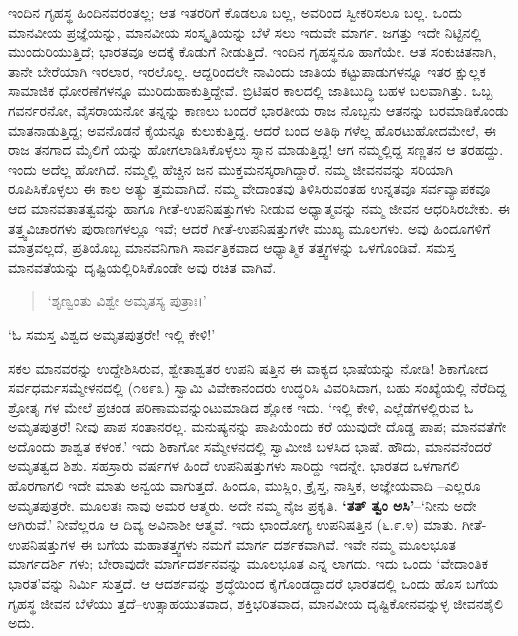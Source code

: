 ಇಂದಿನ ಗೃಹಸ್ಥ ಹಿಂದಿನವರಂತಲ್ಲ; ಆತ ಇತರರಿಗೆ ಕೊಡಲೂ ಬಲ್ಲ, ಅವರಿಂದ ಸ್ವೀಕರಿಸಲೂ ಬಲ್ಲ. ಒಂದು ಮಾನವೀಯ ಪ್ರಜ್ಞೆಯನ್ನು, ಮಾನವೀಯ ಸಂಸ್ಕೃತಿಯನ್ನು ಬೆಳೆ ಸಲು ಇದುವೇ ಮಾರ್ಗ. ಜಗತ್ತು ಇದೇ ನಿಟ್ಟಿನಲ್ಲಿ ಮುಂದುರಿಯುತ್ತಿದೆ; ಭಾರತವೂ ಅದಕ್ಕೆ ಕೊಡುಗೆ ನೀಡುತ್ತಿದೆ. ಇಂದಿನ ಗೃಹಸ್ಥನೂ ಹಾಗೆಯೇ. ಆತ ಸಂಕುಚಿತನಾಗಿ, ತಾನೇ ಬೇರೆಯಾಗಿ ಇರಲಾರ, ಇರಲೊಲ್ಲ. ಆದ್ದರಿಂದಲೇ ನಾವಿಂದು ಜಾತಿಯ ಕಟ್ಟುಪಾಡುಗಳನ್ನೂ ಇತರ ಕ್ಷುಲ್ಲಕ ಸಾಮಾಜಿಕ ಧೋರಣೆಗಳನ್ನೂ ಮುರಿದುಹಾಕುತ್ತಿದ್ದೇವೆ. ಬ್ರಿಟಿಷರ ಕಾಲದಲ್ಲಿ ಜಾತಿಬುದ್ಧಿ ಬಹಳ ಬಲವಾಗಿತ್ತು. ಒಬ್ಬ ಗವರ್ನರನೋ, ವೈಸರಾಯನೋ ತನ್ನನ್ನು ಕಾಣಲು ಬಂದರೆ ಭಾರತೀಯ ರಾಜ ನೊಬ್ಬನು ಆತನನ್ನು ಬರಮಾಡಿಕೊಂಡು ಮಾತನಾಡುತ್ತಿದ್ದ; ಅವನೊಡನೆ ಕೈಯನ್ನೂ ಕುಲುಕುತ್ತಿದ್ದ. ಆದರೆ ಬಂದ ಅತಿಥಿ ಗಳೆಲ್ಲ ಹೊರಟುಹೋದಮೇಲೆ, ಈ ರಾಜ ತನಗಾದ ಮೈಲಿಗೆ ಯನ್ನು ಹೋಗಲಾಡಿಸಿಕೊಳ್ಳಲು ಸ್ನಾನ ಮಾಡುತ್ತಿದ್ದ! ಆಗ ನಮ್ಮಲ್ಲಿದ್ದ ಸಣ್ಣತನ ಆ ತರಹದ್ದು. ಇಂದು ಅದೆಲ್ಲ ಹೋಗಿದೆ. ನಮ್ಮಲ್ಲಿ ಹೆಚ್ಚಿನ ಜನ ಮುಕ್ತಮನಸ್ಕರಾಗಿದ್ದಾರೆ. ನಮ್ಮ ಜೀವನವನ್ನು ಸರಿಯಾಗಿ ರೂಪಿಸಿಕೊಳ್ಳಲು ಈ ಕಾಲ ಅತ್ಯು ತ್ತಮವಾಗಿದೆ. ನಮ್ಮ ವೇದಾಂತವು ತಿಳಿಸಿರುವಂತಹ ಉನ್ನತವೂ ಸರ್ವವ್ಯಾಪಕವೂ ಆದ ಮಾನವತಾತತ್ವವನ್ನು ಹಾಗೂ ಗೀತೆ-ಉಪನಿಷತ್ತುಗಳು ನೀಡುವ ಅಧ್ಯಾತ್ಮವನ್ನು ನಮ್ಮ ಜೀವನ ಆಧರಿಸಿರಬೇಕು. ಈ ತತ್ತ್ವವಿಚಾರಗಳು ಪುರಾಣಗಳಲ್ಲೂ ಇವೆ; ಆದರೆ ಗೀತೆ-ಉಪನಿಷತ್ತುಗಳೇ ಮುಖ್ಯ ಮೂಲಗಳು. ಅವು ಹಿಂದೂಗಳಿಗೆ ಮಾತ್ರವಲ್ಲದೆ, ಪ್ರತಿಯೊಬ್ಬ ಮಾನವನಿಗಾಗಿ ಸಾರ್ವತ್ರಿಕವಾದ ಆಧ್ಯಾತ್ಮಿಕ ತತ್ತ್ವಗಳನ್ನು ಒಳಗೊಂಡಿವೆ. ಸಮಸ್ತ ಮಾನವತೆಯನ್ನು ದೃಷ್ಟಿಯಲ್ಲಿರಿಸಿಕೊಂಡೇ ಅವು ರಚಿತ ವಾಗಿವೆ.

\begin{verse}
‘ಶೃಣ್ವಂತು ವಿಶ್ವೇ ಅಮೃತಸ್ಯ ಪುತ್ರಾಃ।’
\end{verse}

‘ಓ ಸಮಸ್ತ ವಿಶ್ವದ ಅಮೃತಪುತ್ರರೇ! ಇಲ್ಲಿ ಕೇಳಿ!’

ಸಕಲ ಮಾನವರನ್ನು ಉದ್ದೇಶಿಸಿರುವ, ಶ್ವೇತಾಶ್ವತರ ಉಪನಿ ಷತ್ತಿನ ಈ ವಾಕ್ಯದ ಭಾಷೆಯನ್ನು ನೋಡಿ! ಶಿಕಾಗೋದ ಸರ್ವಧರ್ಮಸಮ್ಮೇಳನದಲ್ಲಿ (೧೮೯೩) ಸ್ವಾಮಿ ವಿವೇಕಾನಂದರು ಉದ್ಧರಿಸಿ ವಿವರಿಸಿದಾಗ, ಬಹು ಸಂಖ್ಯೆಯಲ್ಲಿ ನೆರೆದಿದ್ದ ಶ್ರೋತೃ ಗಳ ಮೇಲೆ ಪ್ರಚಂಡ ಪರಿಣಾಮವನ್ನುಂಟುಮಾಡಿದ ಶ್ಲೋಕ ಇದು. ‘ಇಲ್ಲಿ ಕೇಳಿ, ಎಲ್ಲೆಡೆಗಳಲ್ಲಿರುವ ಓ ಅಮೃತಪುತ್ರರೆ! ನೀವು ಪಾಪ ಸಂತಾನರಲ್ಲ. ಮನುಷ್ಯನನ್ನು ಪಾಪಿಯೆಂದು ಕರೆ ಯುವುದೇ ದೊಡ್ಡ ಪಾಪ; ಮಾನವತೆಗೇ ಅದೊಂದು ಶಾಶ್ವತ ಕಳಂಕ.’ ಇದು ಶಿಕಾಗೋ ಸಮ್ಮೇಳನದಲ್ಲಿ ಸ್ವಾಮೀಜಿ ಬಳಸಿದ ಭಾಷೆ. ಹೌದು, ಮಾನವನೆಂದರೆ ಅಮೃತತ್ವದ ಶಿಶು. ಸಹಸ್ರಾರು ವರ್ಷಗಳ ಹಿಂದೆ ಉಪನಿಷತ್ತುಗಳು ಸಾರಿದ್ದು ಇದನ್ನೇ. ಭಾರತದ ಒಳಗಾಗಲಿ ಹೊರಗಾಗಲಿ ಇದೇ ಮಾತು ಅನ್ವಯ ವಾಗುತ್ತದೆ. ಹಿಂದೂ, ಮುಸ್ಲಿಂ, ಕ್ರೈಸ್ತ, ನಾಸ್ತಿಕ, ಅಜ್ಞೇಯವಾದಿ –ಎಲ್ಲರೂ ಅಮೃತಪುತ್ರರೇ. ಮೂಲತಃ ನಾವು ಅಮರ ಆತ್ಮರು. ಅದೇ ನಮ್ಮ ನೈಜ ಪ್ರಕೃತಿ. \textbf{‘ತತ್ ತ್ವಂ ಅಸಿ’}–‘ನೀನು ಅದೇ ಆಗಿರುವೆ.’ ನೀವೆಲ್ಲರೂ ಆ ದಿವ್ಯ ಅವಿನಾಶೀ ಆತ್ಮವೆ. ಇದು ಛಾಂದೋಗ್ಯ ಉಪನಿಷತ್ತಿನ (೬.೯.೪) ಮಾತು. ಗೀತೆ- ಉಪನಿಷತ್ತುಗಳ ಈ ಬಗೆಯ ಮಹಾತತ್ತ್ವಗಳು ನಮಗೆ ಮಾರ್ಗ ದರ್ಶಕವಾಗಿವೆ. ಇವೇ ನಮ್ಮ ಮೂಲಭೂತ ಮಾರ್ಗದರ್ಶಿ ಗಳು; ಬೇರಾವುದೇ ಮಾರ್ಗದರ್ಶನವನ್ನು ಮೂಲಭೂತ ಎನ್ನ ಲಾಗದು. ಇದು ಒಂದು ‘ವೇದಾಂತಿಕ ಭಾರತ’ವನ್ನು ನಿರ್ಮಿ ಸುತ್ತದೆ. ಆ ಆದರ್ಶವನ್ನು ಶ್ರದ್ಧೆಯಿಂದ ಕೈಗೊಂಡದ್ದಾದರೆ ಭಾರತದಲ್ಲಿ ಒಂದು ಹೊಸ ಬಗೆಯ ಗೃಹಸ್ಥ ಜೀವನ ಬೆಳೆಯು ತ್ತದೆ–ಉತ್ಸಾಹಯುತವಾದ, ಶಕ್ತಿಭರಿತವಾದ, ಮಾನವೀಯ ದೃಷ್ಟಿಕೋನವನ್ನುಳ್ಳ ಜೀವನಶೈಲಿ ಅದು.

